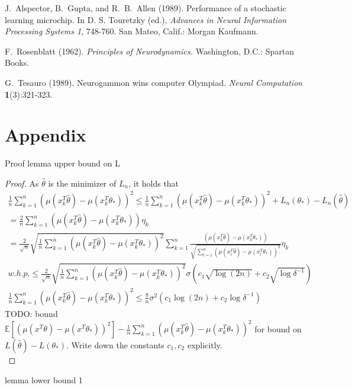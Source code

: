 \documentclass[twoside]{article} \usepackage{aistats2017}
\newcommand{\EV}[1] {
  \mathbb{E}\left[#1\right]}
\begin{document}
J.~Alspector, B.~Gupta, and R.~B.~Allen (1989). Performance of a
stochastic learning microchip.  In D. S. Touretzky (ed.), {\it
  Advances in Neural Information Processing Systems 1}, 748-760.  San
Mateo, Calif.: Morgan Kaufmann.

F.~Rosenblatt (1962). {\it Principles of Neurodynamics.} Washington,
D.C.: Spartan Books.

G.~Tesauro (1989). Neurogammon wins computer Olympiad.  {\it Neural
  Computation} {\bf 1}(3):321-323.


\section{Appendix}

Proof lemma upper bound on L
\begin{proof}
    As $\hat{\theta}$ is the minimizer of $L_n$, it holds that
    \begin{align*}
        \frac{1}{n}\sum_{k=1}^n(\mu(x_k^T\hat{\theta})-\mu(x_k^T\theta_*))^2 \leq \frac{1}{n}\sum_{k=1}^n(\mu(x_k^T\hat{\theta})-\mu(x_k^T\theta_*))^2 + L_n(\theta_*)-L_n(\hat{\theta})\\
        = \frac{2}{n}\sum_{k=1}^n(\mu(x_k^T\hat{\theta})-\mu(x_k^T\theta_*))\eta_k\\
        = \frac{2}{\sqrt{n}}\sqrt{\frac{1}{n}\sum_{k=1}^n(\mu(x_k^T\hat{\theta})-\mu(x_k^T\theta_*))^2}\sum_{k=1}^n\frac{(\mu(x_k^T\hat{\theta})-\mu(x_k^T\theta_*))}{\sqrt{\sum_{l=1}^n(\mu(x_l^T\hat{\theta})-\mu(x_l^T\theta_*))^2}}\eta_k\\
        w.h.p. \leq   \frac{2}{\sqrt{n}}\sqrt{ \frac{1}{n}\sum_{k=1}^n(\mu(x_k^T\hat{\theta})-\mu(x_k^T\theta_*))^2 }\sigma(c_1\sqrt{\log(2n)}+c_2\sqrt{\log{\delta^{-1}}})\\
        \frac{1}{n}\sum_{k=1}^n(\mu(x_k^T\hat{\theta})-\mu(x_k^T\theta_*))^2 \leq \frac{8}{n}\sigma^2(c_1\log(2n)+c_2\log{\delta^{-1}})
    \end{align*}
    \color{red}TODO: bound $\EV{(\mu(x^T\theta)-\mu(x^T\theta_*))^2}-\frac{1}{n}\sum_{k=1}^n(\mu(x_k^T\hat{\theta})-\mu(x_k^T\theta_*))^2$ for bound on $L(\hat{\theta})-L(\theta_*)$. Write down the constants $c_1, c_2$ explicitly.\color{black}\\
\end{proof}
lemma lower bound 1
\end{document}
